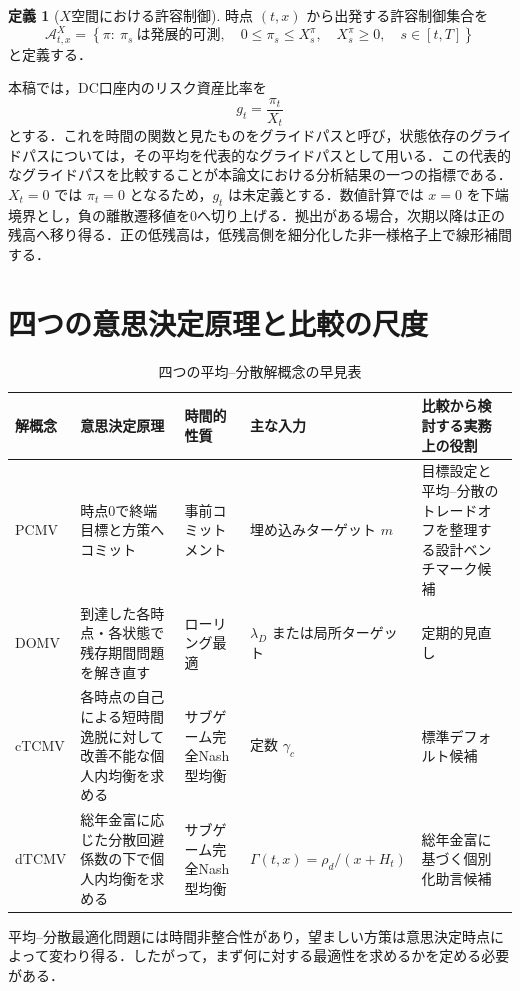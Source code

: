 \documentclass[10pt,a4paper]{article}
\theoremstyle{plain}
\theoremstyle{definition}
\newtheorem{definition}{定義}
\newcommand{\A}{\mathcal{A}}
\begin{document}
\begin{definition}[$X$空間における許容制御]
時点 $(t,x)$ から出発する許容制御集合を
\begin{equation}
  \A^X_{t,x}
  =
  \left\{
  \pi:\ \pi_s\ \text{は発展的可測},\quad
  0\leq\pi_s\leq X_s^\pi,\quad X_s^\pi\geq0,\quad s\in[t,T]
  \right\}
  \label{eq:admissible-X}
\end{equation}
と定義する．
\end{definition}

本稿では，DC口座内のリスク資産比率を
\begin{equation}
  g_t=\frac{\pi_t}{X_t}
  \label{eq:glidepath-def}
\end{equation}
とする．これを時間の関数と見たものをグライドパスと呼び，状態依存のグライドパスについては，その平均を代表的なグライドパスとして用いる．この代表的なグライドパスを比較することが本論文における分析結果の一つの指標である．$X_t=0$ では $\pi_t=0$ となるため，$g_t$ は未定義とする．数値計算では $x=0$ を下端境界とし，負の離散遷移値を0へ切り上げる．拠出がある場合，次期以降は正の残高へ移り得る．正の低残高は，低残高側を細分化した非一様格子上で線形補間する．




\section{四つの意思決定原理と比較の尺度}\label{sec:principles-main}
\begin{table}[htbp]
\centering
\scriptsize
\caption{四つの平均--分散解概念の早見表}
\label{tab:four-concepts-guide}
\begin{tabularx}{\textwidth}{p{16mm}p{39mm}p{25mm}p{28mm}X}
\toprule
解概念 & 意思決定原理 & 時間的性質 & 主な入力 & 比較から検討する実務上の役割 \\
\midrule
PCMV & 時点0で終端目標と方策へコミット & 事前コミットメント & 埋め込みターゲット $m$ & 目標設定と平均--分散のトレードオフを整理する設計ベンチマーク候補 \\
DOMV & 到達した各時点・各状態で残存期間問題を解き直す & ローリング最適 & $\lambda_D$ または局所ターゲット & 定期的見直し \\
cTCMV & 各時点の自己による短時間逸脱に対して改善不能な個人内均衡を求める & サブゲーム完全Nash型均衡 & 定数 $\gamma_c$ & 標準デフォルト候補 \\
dTCMV & 総年金富に応じた分散回避係数の下で個人内均衡を求める & サブゲーム完全Nash型均衡 & $\Gamma(t,x)=\rho_d/(x+H_t)$ & 総年金富に基づく個別化助言候補 \\
\bottomrule
\end{tabularx}
\end{table}
平均--分散最適化問題には時間非整合性があり，望ましい方策は意思決定時点によって変わり得る．したがって，まず何に対する最適性を求めるかを定める必要がある．
\end{document}
